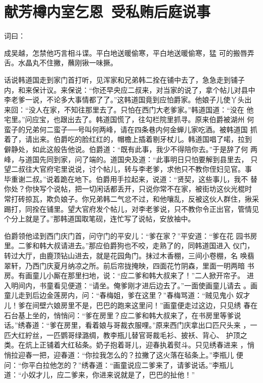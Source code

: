 \chapter{献芳樽内室乞恩~受私贿后庭说事}

词曰：

成吴越，怎禁他巧言相斗谍。平白地送暖偷寒，平白地送暖偷寒，猛
可的搬唇弄舌。水晶丸不住撇，蘸刚锹一味撅。

话说韩道国走到家门首打听，见浑家和兄弟韩二拴在铺中去了，急急走到铺子
内，和来保计议。来保说：“你还早央应二叔来，对当家的说了，拿个帖儿对县中
李老爹一说，不论多大事情都了了。”这韩道国竟到应怕爵家。他娘子儿使丫头出
来回：“没人在家，不知往那里去了。只怕在西门大老爹家。”韩道国道：“没在
他宅里。”问应宝，也跟出去了。韩道国慌了，往勾栏院里抓寻。原来伯爵被湖州
何蛮子的兄弟何二蛮子──号叫何两峰，请在四条巷内何金蝉儿家吃酒。被韩道国
抓着了，请出来。伯爵吃的脸红红的，帽檐上插着剔牙杖儿。韩道国唱了喏，拉到
僻静处，如此这般告他说。伯爵道：“既有此事，我少不得陪你去。”于是辞了何
两峰，与道国先同到家，问了端的。道国央及道：“此事明日只怕要解到县里去，
只望二叔往大官府宅里说说，讨个帖儿，转与李老爹，求他只不教你侄妇见官。事
毕重谢二叔。”说着跪在地下。伯爵用手拉起来，说道：“贤契，这些事儿，我不
替你处？你快写个说帖，把一切闲话都丢开，只说你常不在家，被街坊这伙光棍时
常打砖掠瓦，欺负娘子。你兄弟韩二气忿不过，和他嚷乱，反被这伙人群住，揪采
踢打，同拴在铺里。望大官府发个帖儿，对李老爹说，只不教你令正出官，管情见
个分上就是了。”那韩道国取笔砚，连忙写了说帖，安放袖中。

伯爵领他迳到西门庆门首，问守门的平安儿：“爹在家？”平安道：“爹在花
园书房里。二爹和韩大叔请进去。”那应伯爵狗也不咬，走熟了的，同韩道国进入
仪门，转过大厅，由鹿顶钻山进去，就是花园角门。抹过木香棚，三间小卷棚，名
唤翡翠轩，乃西门庆夏月纳凉之所。前后帘拢掩映，四面花竹阴森，里面一明两暗
书房。有画童儿小厮在那里扫地，说：“应二爹和韩大叔来了！”二人掀开帘子。
进入明间内，书童看见便道：“请坐。俺爹刚才进后边去了。”一面使画童儿请去
。画童儿走到后边金莲房内，问：“春梅姐，爹在这里？”春梅骂道：“贼见鬼小
奴才儿！爹在间壁六娘房里不是，巴巴的跑来这里问！”画童便走过这边，只见绣
春在石台基上坐的，悄悄问：“爹在房里？应二爹和韩大叔来了，在书房里等爹说
话。”绣春道：“爹在房里，看着娘与哥裁衣服哩。”原来西门庆拿出口匹尺头来
，一匹大红紵丝，一匹鹦哥绿潞绸，教李瓶儿替官哥裁毛衫、披袄、背心、
护顶之类。在炕上正铺着大红毡条。奶子抱着哥儿，迎春执着熨斗。只见绣春进来
，悄悄拉迎春一把，迎春道：“你拉我怎么的？拉撇了这火落在毡条上。”李瓶儿
便问：“你平白拉他怎的？”绣春道：“画童说应二爹来了，请爹说话。”李瓶儿
道：“小奴才儿，应二爹来，你进来说就是了，巴巴的扯他！”

